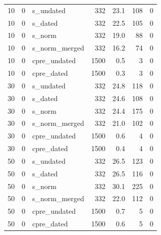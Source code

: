 \begin{longtable}{rrlrrrr}
10 & 0 & s\_undated & 332 & 23.1 & 108 & 0 \\
10 & 0 & s\_dated & 332 & 22.5 & 105 & 0 \\
10 & 0 & s\_norm & 332 & 19.0 & 88 & 0 \\
10 & 0 & s\_norm\_merged & 332 & 16.2 & 74 & 0 \\
10 & 0 & cpre\_undated & 1500 & 0.5 & 3 & 0 \\
10 & 0 & cpre\_dated & 1500 & 0.3 & 3 & 0 \\
30 & 0 & s\_undated & 332 & 24.8 & 118 & 0 \\
30 & 0 & s\_dated & 332 & 24.6 & 108 & 0 \\
30 & 0 & s\_norm & 332 & 24.4 & 175 & 0 \\
30 & 0 & s\_norm\_merged & 332 & 21.0 & 102 & 0 \\
30 & 0 & cpre\_undated & 1500 & 0.6 & 4 & 0 \\
30 & 0 & cpre\_dated & 1500 & 0.4 & 4 & 0 \\
50 & 0 & s\_undated & 332 & 26.5 & 123 & 0 \\
50 & 0 & s\_dated & 332 & 26.5 & 116 & 0 \\
50 & 0 & s\_norm & 332 & 30.1 & 225 & 0 \\
50 & 0 & s\_norm\_merged & 332 & 22.0 & 112 & 0 \\
50 & 0 & cpre\_undated & 1500 & 0.7 & 5 & 0 \\
50 & 0 & cpre\_dated & 1500 & 0.6 & 5 & 0 \\
\hline
\end{longtable}
